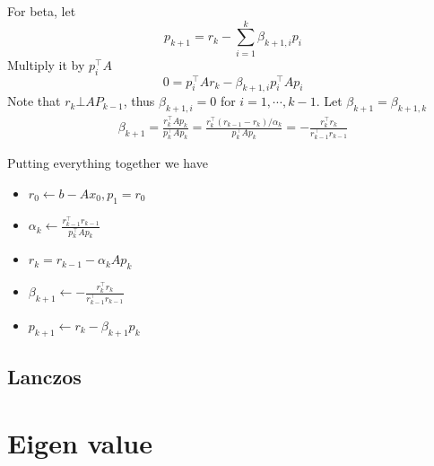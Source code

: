 \documentclass{article}
\begin{document}
For beta, let
$$p_{k+1} = r_k - \sum_{i=1}^k \beta_{k+1, i} p_i$$
Multiply it by $p_i^\top A$
$$0 = p_i^\top A r_k - \beta_{k+1, i} p_i^\top A p_i$$
Note that $r_k \bot AP_{k-1}$, thus $\beta_{k+1, i} = 0$ for $i=1, \cdots, k-1$. Let
$\beta_{k+1} = \beta_{k+1, k}$
\begin{align}
\beta_{k+1} = \frac{r_k^\top A p_k}{p_k^\top A p_k} = \frac{r_k^\top (r_{k-1} - r_{k})/\alpha_k}{p_k^\top A p_k} = -\frac{r_{k}^\top r_k}{r_{k-1}^\top r_{k-1}}
\end{align}

Putting everything together we have
\begin{itemize}
    \item $r_0 \leftarrow b - Ax_0, p_1 = r_0$
    \item $\alpha_k \leftarrow \frac{r_{k-1}^\top r_{k-1}}{p_k^\top A p_k}$
    \item $r_k = r_{k-1} - \alpha_k A p_k$
    \item $\beta_{k+1} \leftarrow -\frac{r_{k}^\top r_k}{r_{k-1}^\top r_{k-1}}$
    \item $p_{k+1} \leftarrow r_k - \beta_{k+1}p_k$
\end{itemize}

\subsection{Lanczos}

\section{Eigen value}
\end{document}
